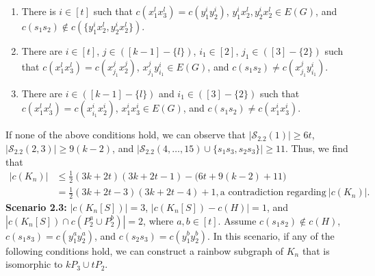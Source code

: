 \documentclass[12pt]{article}
\begin{document}
\begin{enumerate}
    \item There is $i\in[t]$ such that $c(x_1^lx_3^l)=c(y^i_1y^i_2)$, $y^i_1x_2^l,y^i_2x_2^l\in E(G)$, and $c(s_1s_2)\not\in c(\{y^i_1x_2^l,y^i_2x_2^l\})$.
    \item There are $i\in[t]$, \( j \in ([k - 1] - \{ l \}) \), $i_1\in[2]$, \( j_1\in( [3]-\{2\}) \) such that \( c(x_1^l x_3^l) = c(x^j_{j_1} x^j_2) \), $x^j_{j_1} y^i_{i_1}\in E(G)$, and $c(s_1s_2)\neq c(x^j_{j_1} y^i_{i_1})$.
     \item There are \( i \in( [k-1] - \{l\}) \) and \( i_1 \in ([3] - \{2\}) \) such that \( c(x_1^l x_3^l) = c(x^i_{i_1} x^i_2) \),  \( x_1^i x_3^i\in E(G) \), and $c(s_1s_2)\neq c(x_1^i x_3^i)$.
\end{enumerate}
If none of the above conditions hold, we can observe that $|\mathcal{S}_{2.2}(1)| \geq 6t$, $|\mathcal{S}_{2.2}(2,3)| \geq 9(k-2)$, and $|\mathcal{S}_{2.2}(4,\ldots,15) \cup \{s_1s_3,s_2s_3\}| \geq 11$. Thus, we find that
\begin{align*}
|c(K_n)|&\leq  \frac{1}{2}(3k+2t)(3k+2t-1)-\big(6t+9(k-2)+11\big)\\
&=\frac{1}{2}(3k+2t-3)(3k+2t-4)+1,\text{a contradiction regarding}~|c(K_n)|.
\end{align*}
{\bf Scenario 2.3:}  $|c(K_n[S])|=3$, \(| c(K_n[S])- c(H)|=1 \), and  $|c(K_n[S])\cap c(P_2^a\cup P_2^b)|=2$, where $a,b\in[t]$. Assume \( c(s_1s_2) \notin c(H) \), $c(s_1s_3)=c(y^a_1y^a_2)$, and $c(s_2s_3)=c(y^b_1y^b_2)$. In this scenario, if any of the following conditions hold, we can construct a rainbow subgraph of \( K_n \) that is isomorphic to \( kP_3 \cup tP_2 \).
\end{document}
